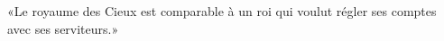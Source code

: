 \encetemps \jesusdisciplesparabole
	«Le royaume des Cieux est comparable à un roi
	qui voulut régler ses comptes avec ses serviteurs.»
